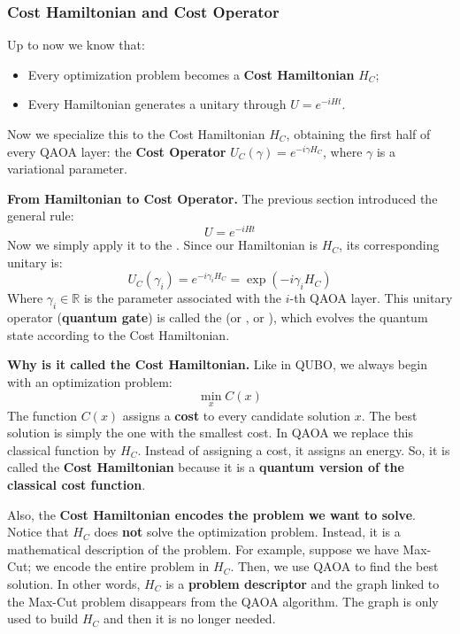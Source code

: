 \subsubsection{Cost Hamiltonian and Cost Operator}\label{sec:cost-hamiltonian-and-cost-operator}

Up to now we know that:
\begin{itemize}
    \item Every optimization problem becomes a \textbf{Cost Hamiltonian} $H_C$;
    \item Every Hamiltonian generates a unitary through $U = e^{-i H t}$.
\end{itemize}
Now we specialize this to the Cost Hamiltonian $H_C$, obtaining the first half of every QAOA layer: the \textbf{Cost Operator} $U_C(\gamma) = e^{-i \gamma H_C}$, where $\gamma$ is a variational parameter.

\highspace
\textcolor{Green3}{ \textbf{From Hamiltonian to Cost Operator.}} The previous section introduced the general rule:
\begin{equation*}
    U = e^{-i H t}
\end{equation*}
Now we simply apply it to the . Since our Hamiltonian is $H_C$, its corresponding unitary is:
\begin{equation}\label{eq:cost-operator}
    U_C\left(\gamma_i\right) = e^{-i \gamma_i H_C} = \exp\left(-i \gamma_i H_C\right)
\end{equation}
Where $\gamma_i \in \mathbb{R}$ is the parameter associated with the $i$-th QAOA layer. This unitary operator (\textbf{quantum gate}) is called the  (or , or ), which evolves the quantum state according to the Cost Hamiltonian.

\highspace
\textcolor{Green3}{ \textbf{Why is it called the Cost Hamiltonian.}} Like in QUBO, we always begin with an optimization problem:
\begin{equation*}
    \min_{x} C(x)
\end{equation*}
The function $C(x)$ assigns a \textbf{cost} to every candidate solution $x$. The best solution is simply the one with the smallest cost. In QAOA we replace this classical function by $H_C$. Instead of assigning a cost, it assigns an energy. So, it is called the \textbf{Cost Hamiltonian} because it is a \textbf{quantum version of the classical cost function}.

\highspace
Also, the \textbf{Cost Hamiltonian encodes the problem we want to solve}. Notice that $H_C$ does \textbf{not} solve the optimization problem. Instead, it is a mathematical description of the problem. For example, suppose we have Max-Cut; we encode the entire problem in $H_C$. Then, we use QAOA to find the best solution. In other words, $H_C$ is a \textbf{problem descriptor} and the graph linked to the Max-Cut problem disappears from the QAOA algorithm. The graph is only used to build $H_C$ and then it is no longer needed.


